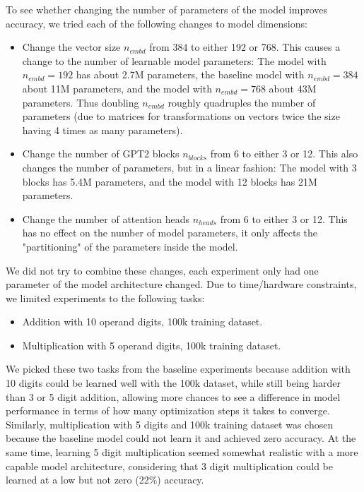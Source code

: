 To see whether changing the number of parameters of the model improves accuracy, we tried each of the following changes to model dimensions:

\begin{itemize}
	\item Change the vector size $n_{embd}$ from 384 to either 192 or 768. This causes a change to the number of learnable model parameters: The model with $n_{embd}=192$ has about 2.7M parameters, the baseline model with $n_{embd}=384$ about 11M parameters, and the model with $n_{embd}=768$ about 43M parameters. Thus doubling $n_{embd}$ roughly quadruples the number of parameters (due to matrices for transformations on vectors twice the size having 4 times as many parameters).
	\item Change the number of GPT2 blocks $n_{blocks}$ from 6 to either 3 or 12. This also changes the number of parameters, but in a linear fashion: The model with 3 blocks has 5.4M parameters, and the model with 12 blocks has 21M parameters. 
	\item Change the number of attention heads $n_{heads}$ from 6 to either 3 or 12. This has no effect on the number of model parameters, it only affects the "partitioning" of the parameters inside the model.
\end{itemize}

We did not try to combine these changes, each experiment only had one parameter of the model architecture changed.
Due to time/hardware constraints, we limited experiments to the following tasks:

\begin{itemize}
	\item Addition with 10 operand digits, 100k training dataset.
	\item Multiplication with 5 operand digits, 100k training dataset.
\end{itemize}

We picked these two tasks from the baseline experiments because addition with 10 digits could be learned well with the 100k dataset, while still being harder than 3 or 5 digit addition, allowing more chances to see a difference in model performance in terms of how many optimization steps it takes to converge.
Similarly, multiplication with 5 digits and 100k training dataset was chosen because the baseline model could not learn it and achieved zero accuracy. At the same time, learning 5 digit multiplication seemed somewhat realistic with a more capable model architecture, considering that 3 digit multiplication could be learned at a low but not zero (22\%) accuracy.


